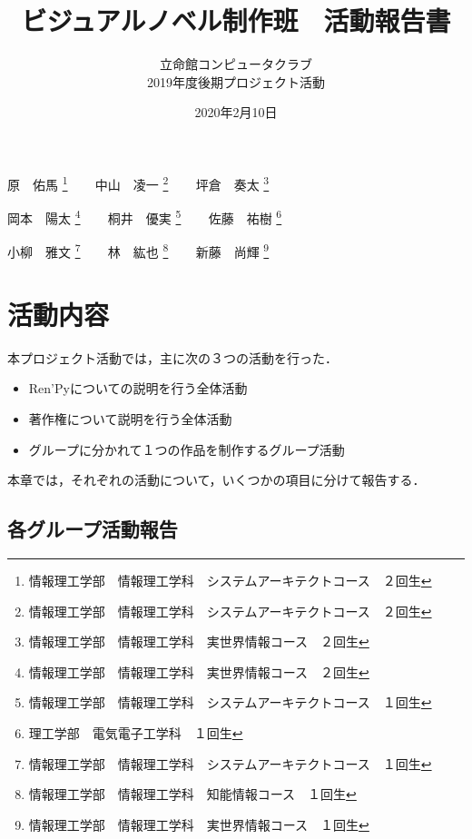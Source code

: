 \documentclass[a4paper]{jarticle}
\title{ビジュアルノベル制作班　活動報告書}
\author{立命館コンピュータクラブ\\2019年度後期プロジェクト活動}
\date{2020年2月10日}
\begin{document}
  \maketitle

  \begin{center}
    原　佑馬 \footnote{情報理工学部　情報理工学科　システムアーキテクトコース　２回生}
    ~~~
    中山　凌一 \footnote{情報理工学部　情報理工学科　システムアーキテクトコース　２回生}
    ~~~
    坪倉　奏太 \footnote{情報理工学部　情報理工学科　実世界情報コース　２回生}
    
    岡本　陽太 \footnote{情報理工学部　情報理工学科　実世界情報コース　２回生}
    ~~~
    桐井　優実 \footnote{情報理工学部　情報理工学科　システムアーキテクトコース　１回生}
    ~~~
    佐藤　祐樹 \footnote{理工学部　電気電子工学科　１回生}
    
    小柳　雅文 \footnote{情報理工学部　情報理工学科　システムアーキテクトコース　１回生}
    ~~~
    林　紘也 \footnote{情報理工学部　情報理工学科　知能情報コース　１回生}
    ~~~
    新藤　尚輝 \footnote{情報理工学部　情報理工学科　実世界情報コース　１回生}

  \end{center}

  \newpage
  \tableofcontents
  \newpage

  
  
  \section{活動内容}

    本プロジェクト活動では，主に次の３つの活動を行った．

    \begin{itemize}
      \item Ren'Pyについての説明を行う全体活動
      \item 著作権について説明を行う全体活動
      \item グループに分かれて１つの作品を制作するグループ活動
    \end{itemize}
      
    本章では，それぞれの活動について，いくつかの項目に分けて報告する．

    

    

    

    

    \subsection{各グループ活動報告}

      

      

      

    

    

    
\end{document}
